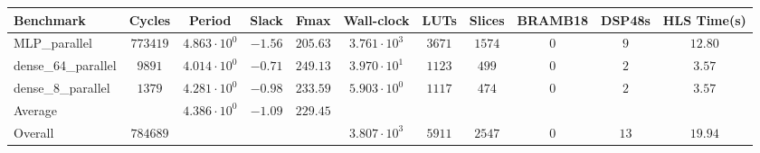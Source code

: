 \begin{tabular}{|l|c|c|c|c|c|c|c|c|c|c|}
\hline
Benchmark           & Cycles     & Period                 & Slack     & Fmax       & Wall-clock             & LUTs     & Slices   & BRAMB18 & DSP48s & HLS Time(s) \\
\hline
MLP\_parallel       & $ 773419 $ & $ 4.863 \cdot 10^{0} $ & $ -1.56 $ & $ 205.63 $ & $ 3.761 \cdot 10^{3} $ & $ 3671 $ & $ 1574 $ & $ 0   $ & $ 9  $ & $ 12.80   $ \\
dense\_64\_parallel & $ 9891   $ & $ 4.014 \cdot 10^{0} $ & $ -0.71 $ & $ 249.13 $ & $ 3.970 \cdot 10^{1} $ & $ 1123 $ & $ 499  $ & $ 0   $ & $ 2  $ & $ 3.57    $ \\
dense\_8\_parallel  & $ 1379   $ & $ 4.281 \cdot 10^{0} $ & $ -0.98 $ & $ 233.59 $ & $ 5.903 \cdot 10^{0} $ & $ 1117 $ & $ 474  $ & $ 0   $ & $ 2  $ & $ 3.57    $ \\
\hline
Average             & $        $ & $ 4.386 \cdot 10^{0} $ & $ -1.09 $ & $ 229.45 $ & $                    $ & $      $ & $      $ & $     $ & $    $ & $         $ \\
\hline
Overall             & $ 784689 $ & $                    $ & $       $ & $        $ & $ 3.807 \cdot 10^{3} $ & $ 5911 $ & $ 2547 $ & $ 0   $ & $ 13 $ & $ 19.94   $ \\
\hline
\end{tabular}
